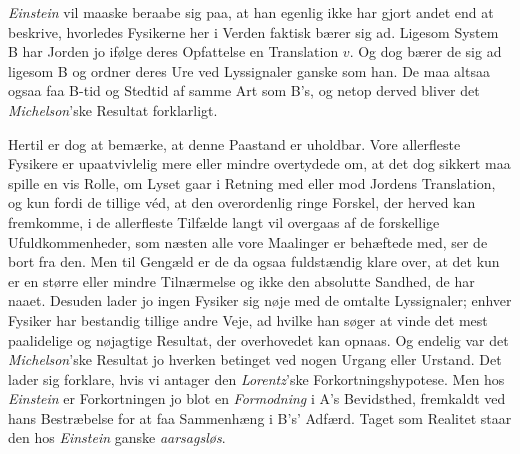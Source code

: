 \documentclass[12pt,a4paper]{article}
\newcommand{\opage}[1]{\marginnote{\footnotesize\textit{[#1]}}}
\begin{document}
\emph{Einstein} vil maaske beraabe sig paa, at han egenlig ikke har gjort
andet end at beskrive, hvorledes Fysikerne her i Verden faktisk bærer sig
ad. Ligesom System B har Jorden jo ifølge deres Opfattelse en Translation
$v$. Og dog bærer de sig ad ligesom B og ordner deres Ure ved Lyssignaler
ganske som han. De maa altsaa ogsaa faa B-tid og Stedtid af samme Art som
B's, og netop derved bliver det \emph{Michelson}'ske Resultat forklarligt.

\opage{17} Hertil er dog at bemærke, at denne Paastand er uholdbar. Vore allerfleste
Fysikere er upaatvivlelig mere eller mindre overtydede om, at det dog
sikkert maa spille en vis Rolle, om Lyset gaar i Retning med eller mod
Jordens Translation, og kun fordi de tillige véd, at den overordenlig ringe
Forskel, der herved kan fremkomme, i de allerfleste Tilfælde langt vil
overgaas af de forskellige Ufuldkommenheder, som næsten alle vore Maalinger
er behæftede med, ser de bort fra den. Men til Gengæld er de da ogsaa
fuldstændig klare over, at det kun er en større eller mindre Tilnærmelse og
ikke den absolutte Sandhed, de har naaet. Desuden lader jo ingen Fysiker
sig nøje med de omtalte Lyssignaler; enhver Fysiker har bestandig tillige
andre Veje, ad hvilke han søger at vinde det mest paalidelige og nøjagtige
Resultat, der overhovedet kan opnaas. Og endelig var det
\emph{Michelson}'ske Resultat jo hverken betinget ved nogen Urgang eller
Urstand. Det lader sig forklare, hvis vi antager den \emph{Lorentz}'ske
Forkortningshypotese. Men hos \emph{Einstein} er Forkortningen jo blot en
\emph{Formodning} i A's Bevidsthed, fremkaldt ved hans Bestræbelse for at
faa Sammenhæng i B's' Adfærd. Taget som Realitet staar den hos
\emph{Einstein} ganske \emph{aarsagsløs}.
\end{document}
